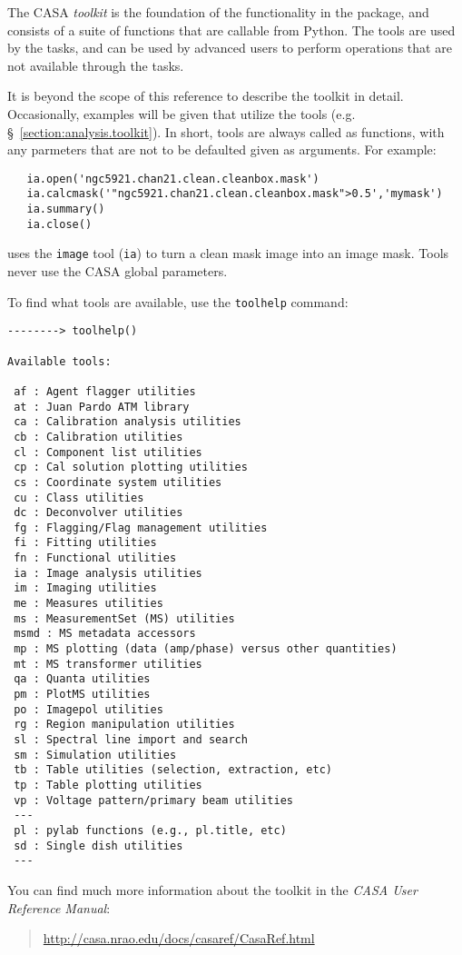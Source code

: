 The CASA {\em toolkit} is the foundation of the functionality in the 
package, and consists of a suite of functions that are callable from
Python.  The tools are used by the tasks, and can be used by advanced
users to perform operations that are not available through the tasks.

It is beyond the scope of this reference to describe the toolkit in 
detail.  Occasionally, examples will be given that utilize the tools
(e.g. \S~\ref{section:analysis.toolkit}).
In short, tools are always called as functions, with any parmeters
that are not to be defaulted given as arguments.  For example:
\small
\begin{verbatim}
   ia.open('ngc5921.chan21.clean.cleanbox.mask')
   ia.calcmask('"ngc5921.chan21.clean.cleanbox.mask">0.5','mymask')
   ia.summary()
   ia.close()
\end{verbatim}
\normalsize
uses the {\tt image} tool ({\tt ia}) to turn a clean mask image into
an image mask.  Tools never use the CASA global parameters.

To find what tools are available, use the {\tt toolhelp} command:
\small
\begin{verbatim}
--------> toolhelp()

Available tools: 

 af : Agent flagger utilities
 at : Juan Pardo ATM library
 ca : Calibration analysis utilities
 cb : Calibration utilities
 cl : Component list utilities
 cp : Cal solution plotting utilities
 cs : Coordinate system utilities
 cu : Class utilities
 dc : Deconvolver utilities
 fg : Flagging/Flag management utilities
 fi : Fitting utilities
 fn : Functional utilities
 ia : Image analysis utilities
 im : Imaging utilities
 me : Measures utilities
 ms : MeasurementSet (MS) utilities
 msmd : MS metadata accessors
 mp : MS plotting (data (amp/phase) versus other quantities)
 mt : MS transformer utilities
 qa : Quanta utilities
 pm : PlotMS utilities
 po : Imagepol utilities
 rg : Region manipulation utilities
 sl : Spectral line import and search
 sm : Simulation utilities
 tb : Table utilities (selection, extraction, etc)
 tp : Table plotting utilities
 vp : Voltage pattern/primary beam utilities
 ---
 pl : pylab functions (e.g., pl.title, etc)
 sd : Single dish utilities
 ---
\end{verbatim}
\normalsize


You can find much more information about the toolkit in the 
{\em CASA User Reference Manual}:
\begin{quote}
  \url{http://casa.nrao.edu/docs/casaref/CasaRef.html}
\end{quote}

